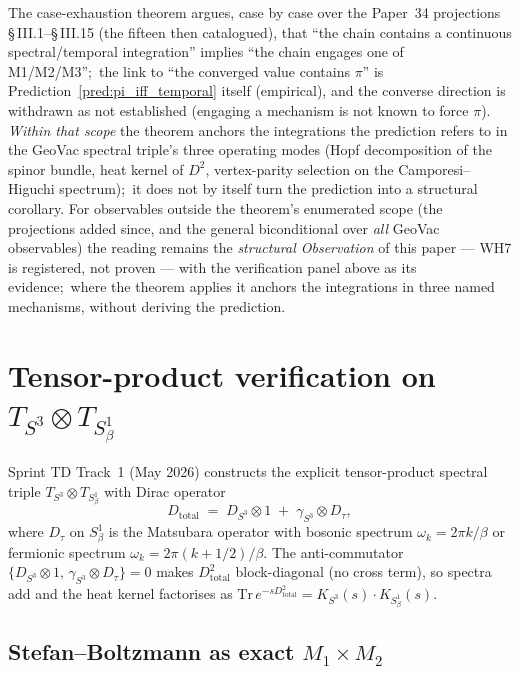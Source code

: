 \documentclass[11pt]{article}
\begin{document}
The case-exhaustion theorem argues, case by case over the Paper~34
projections \S\,III.1--\S\,III.15 (the fifteen then catalogued), that
``the chain contains a continuous spectral/temporal integration''
implies ``the chain engages one of M1/M2/M3'';\ the link to ``the
converged value contains $\pi$'' is Prediction~\ref{pred:pi_iff_temporal}
itself (empirical), and the converse direction is withdrawn as not
established (engaging a mechanism is not known to force $\pi$).  \emph{Within that scope} the theorem
anchors the integrations the prediction refers to in the GeoVac
spectral triple's three operating modes (Hopf decomposition of the
spinor bundle, heat kernel of $D^2$, vertex-parity selection on the
Camporesi--Higuchi spectrum);\ it does not by itself turn the
prediction into a structural corollary.  For observables outside the
theorem's enumerated scope (the projections added since, and the
general biconditional over \emph{all} GeoVac observables) the reading
remains the \emph{structural Observation} of this paper --- WH7 is
registered, not proven --- with the verification panel above as its
evidence;\ where the theorem applies it anchors the
integrations in three named mechanisms, without deriving the
prediction.

\section{Tensor-product verification on $T_{S^3} \otimes T_{S^1_\beta}$}
\label{sec:tensor_product_verification}

Sprint TD Track~1 (May 2026) constructs the explicit tensor-product
spectral triple $T_{S^3} \otimes T_{S^1_\beta}$ with Dirac operator
\begin{equation}
\label{eq:D_total_thermal}
D_{\mathrm{total}} \;=\; D_{S^3} \otimes 1 \;+\; \gamma_{S^3} \otimes D_\tau,
\end{equation}
where $D_\tau$ on $S^1_\beta$ is the Matsubara operator with bosonic
spectrum $\omega_k = 2\pi k / \beta$ or fermionic spectrum
$\omega_k = 2\pi(k + 1/2) / \beta$.  The anti-commutator
$\{D_{S^3}\otimes 1,\, \gamma_{S^3}\otimes D_\tau\} = 0$ makes
$D_{\mathrm{total}}^2$ block-diagonal (no cross term), so spectra add
and the heat kernel factorises as
$\mathrm{Tr}\,e^{-s D_{\mathrm{total}}^2}
   = K_{S^3}(s)\cdot K_{S^1_\beta}(s)$.

\subsection{Stefan--Boltzmann as exact $M_1\times M_2$}
\label{subsec:sb_factorization}
\end{document}
